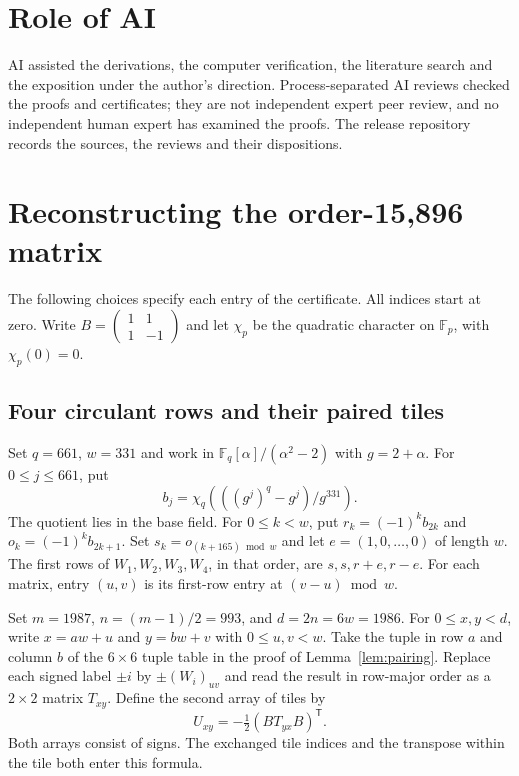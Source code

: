 \documentclass[10pt]{article}
\begin{document}
\section{Role of AI}
AI assisted the derivations, the computer verification, the literature search and the exposition under the author's direction. Process-separated AI reviews checked the proofs and certificates; they are not independent expert peer review, and no independent human expert has examined the proofs. The release repository records the sources, the reviews and their dispositions.

\appendix
\section{Reconstructing the order-15,896 matrix}\label{app:recipe}

The following choices specify each entry of the certificate. All indices start at zero. Write $B=\left(\begin{smallmatrix}1&1\\1&-1\end{smallmatrix}\right)$ and let $\chi_p$ be the quadratic character on $\mathbb F_p$, with $\chi_p(0)=0$.

\subsection*{Four circulant rows and their paired tiles}

Set $q=661$, $w=331$ and work in $\mathbb F_q[\alpha]/(\alpha^2-2)$ with $g=2+\alpha$. For $0\le j\le661$, put
\[
 b_j=\chi_q\!\left(( (g^j)^q-g^j )/g^{331}\right).
\]
The quotient lies in the base field. For $0\le k<w$, put $r_k=(-1)^k b_{2k}$ and $o_k=(-1)^k b_{2k+1}$. Set $s_k=o_{(k+165)\bmod w}$ and let $e=(1,0,\ldots,0)$ of length $w$. The first rows of $W_1,W_2,W_3,W_4$, in that order, are $s,s,r+e,r-e$. For each matrix, entry $(u,v)$ is its first-row entry at $(v-u)\bmod w$.

Set $m=1987$, $n=(m-1)/2=993$, and $d=2n=6w=1986$. For $0\le x,y<d$, write $x=aw+u$ and $y=bw+v$ with $0\le u,v<w$. Take the tuple in row $a$ and column $b$ of the $6\times6$ tuple table in the proof of Lemma~\ref{lem:pairing}. Replace each signed label $\pm i$ by $\pm(W_i)_{uv}$ and read the result in row-major order as a $2\times2$ matrix $T_{xy}$. Define the second array of tiles by
\[
 U_{xy}=-\tfrac12 (B T_{yx} B)^{\mathsf T}.
\]
Both arrays consist of signs. The exchanged tile indices and the transpose within the tile both enter this formula.
\end{document}
